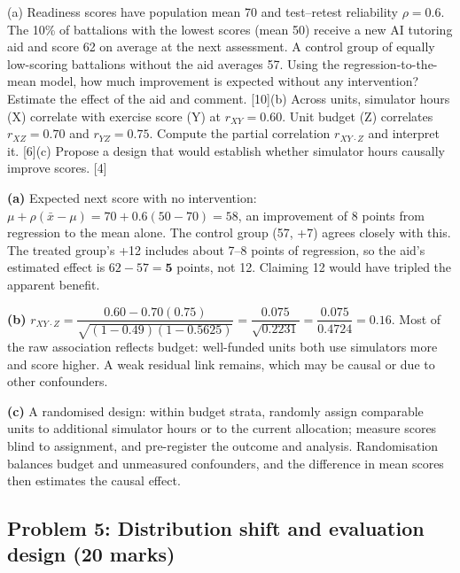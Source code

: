 \documentclass[11pt]{article}
\begin{document}
\begin{prob}(a) Readiness scores have population mean 70 and test--retest reliability $\rho=0.6$. The 10\% of battalions with the lowest scores (mean 50) receive a new AI tutoring aid and score 62 on average at the next assessment. A control group of equally low-scoring battalions without the aid averages 57. Using the regression-to-the-mean model, how much improvement is expected without any intervention? Estimate the effect of the aid and comment. [10]\newline (b) Across units, simulator hours (X) correlate with exercise score (Y) at $r_{XY}=0.60$. Unit budget (Z) correlates $r_{XZ}=0.70$ and $r_{YZ}=0.75$. Compute the partial correlation $r_{XY\cdot Z}$ and interpret it. [6]\newline (c) Propose a design that would establish whether simulator hours causally improve scores. [4]\end{prob}

\begin{soln}\textbf{(a)} Expected next score with no intervention: $\mu+\rho(\bar x-\mu)=70+0.6(50-70)=58$, an improvement of 8 points from regression to the mean alone. The control group (57, +7) agrees closely with this. The treated group's +12 includes about 7--8 points of regression, so the aid's estimated effect is $62-57=\mathbf{5}$ points, not 12. Claiming 12 would have tripled the apparent benefit.

\textbf{(b)} $r_{XY\cdot Z}=\dfrac{0.60-0.70(0.75)}{\sqrt{(1-0.49)(1-0.5625)}}=\dfrac{0.075}{\sqrt{0.2231}}=\dfrac{0.075}{0.4724}=\mathbf{0.16}$. Most of the raw association reflects budget: well-funded units both use simulators more and score higher. A weak residual link remains, which may be causal or due to other confounders.

\textbf{(c)} A randomised design: within budget strata, randomly assign comparable units to additional simulator hours or to the current allocation; measure scores blind to assignment, and pre-register the outcome and analysis. Randomisation balances budget and unmeasured confounders, and the difference in mean scores then estimates the causal effect.\end{soln}

\subsection{Problem 5: Distribution shift and evaluation design \normalfont\small\color{GreyN}(20 marks)}
\end{document}
